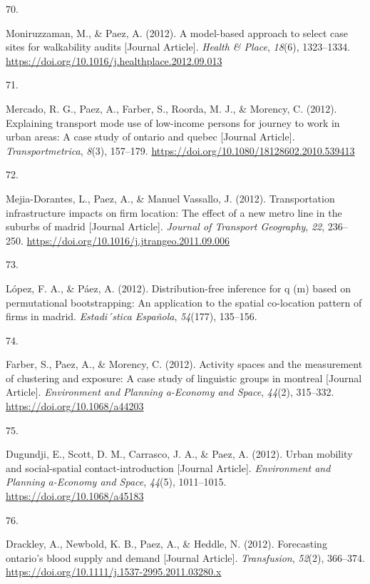 \documentclass[11pt,a4paper,]{awesome-cv}
\newlength{\csllabelwidth}
\newcommand{\CSLLeftMargin}[1]{\parbox[t]{\csllabelwidth}{#1}}
\newcommand{\CSLRightInline}[1]{\parbox[t]{\linewidth - \csllabelwidth}{#1}}
\begin{document}
\leavevmode{}%
\CSLLeftMargin{70. }
\CSLRightInline{Moniruzzaman, M., \& Paez, A. (2012). A model-based
approach to select case sites for walkability audits {[}Journal
Article{]}. \emph{Health \& Place}, \emph{18}(6), 1323--1334.
\url{https://doi.org/10.1016/j.healthplace.2012.09.013}}

\leavevmode{}%
\CSLLeftMargin{71. }
\CSLRightInline{Mercado, R. G., Paez, A., Farber, S., Roorda, M. J., \&
Morency, C. (2012). Explaining transport mode use of low-income persons
for journey to work in urban areas: A case study of ontario and quebec
{[}Journal Article{]}. \emph{Transportmetrica}, \emph{8}(3), 157--179.
\url{https://doi.org/10.1080/18128602.2010.539413}}

\leavevmode{}%
\CSLLeftMargin{72. }
\CSLRightInline{Mejia-Dorantes, L., Paez, A., \& Manuel Vassallo, J.
(2012). Transportation infrastructure impacts on firm location: The
effect of a new metro line in the suburbs of madrid {[}Journal
Article{]}. \emph{Journal of Transport Geography}, \emph{22}, 236--250.
\url{https://doi.org/10.1016/j.jtrangeo.2011.09.006}}

\leavevmode{}%
\CSLLeftMargin{73. }
\CSLRightInline{López, F. A., \& Páez, A. (2012). Distribution-free
inference for q (m) based on permutational bootstrapping: An application
to the spatial co-location pattern of firms in madrid.
\emph{Estadi´stica Española}, \emph{54}(177), 135--156.}

\leavevmode{}%
\CSLLeftMargin{74. }
\CSLRightInline{Farber, S., Paez, A., \& Morency, C. (2012). Activity
spaces and the measurement of clustering and exposure: A case study of
linguistic groups in montreal {[}Journal Article{]}. \emph{Environment
and Planning a-Economy and Space}, \emph{44}(2), 315--332.
\url{https://doi.org/10.1068/a44203}}

\leavevmode{}%
\CSLLeftMargin{75. }
\CSLRightInline{Dugundji, E., Scott, D. M., Carrasco, J. A., \& Paez, A.
(2012). Urban mobility and social-spatial contact-introduction
{[}Journal Article{]}. \emph{Environment and Planning a-Economy and
Space}, \emph{44}(5), 1011--1015. \url{https://doi.org/10.1068/a45183}}

\leavevmode{}%
\CSLLeftMargin{76. }
\CSLRightInline{Drackley, A., Newbold, K. B., Paez, A., \& Heddle, N.
(2012). Forecasting ontario's blood supply and demand {[}Journal
Article{]}. \emph{Transfusion}, \emph{52}(2), 366--374.
\url{https://doi.org/10.1111/j.1537-2995.2011.03280.x}}
\end{document}
